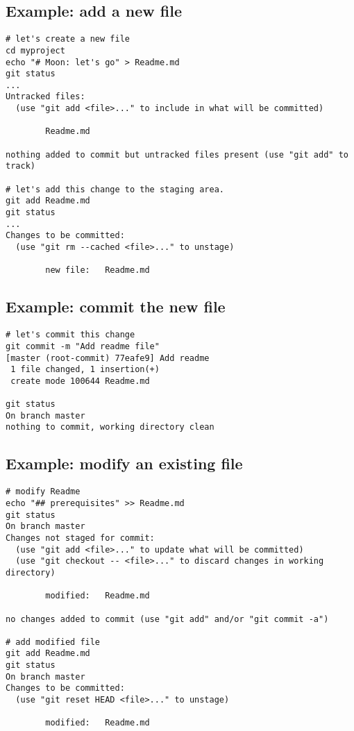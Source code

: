 \subsection{Example: add a new file}
\begin{frame}[fragile]
\subslidetitle
\begin{lstlisting}
# let's create a new file
cd myproject
echo "# Moon: let's go" > Readme.md
git status
...
Untracked files:
  (use "git add <file>..." to include in what will be committed)

        Readme.md

nothing added to commit but untracked files present (use "git add" to track)

# let's add this change to the staging area.
git add Readme.md
git status
...
Changes to be committed:
  (use "git rm --cached <file>..." to unstage)

        new file:   Readme.md
\end{lstlisting}
\end{frame}

\subsection{Example: commit the new file}
\begin{frame}[fragile]
\subslidetitle
\begin{lstlisting}
# let's commit this change
git commit -m "Add readme file"
[master (root-commit) 77eafe9] Add readme
 1 file changed, 1 insertion(+)
 create mode 100644 Readme.md

git status
On branch master
nothing to commit, working directory clean
\end{lstlisting}
\end{frame}

\subsection{Example: modify an existing file}
\begin{frame}[fragile]
\subslidetitle
\begin{lstlisting}
# modify Readme
echo "## prerequisites" >> Readme.md
git status
On branch master
Changes not staged for commit:
  (use "git add <file>..." to update what will be committed)
  (use "git checkout -- <file>..." to discard changes in working directory)

        modified:   Readme.md

no changes added to commit (use "git add" and/or "git commit -a")

# add modified file
git add Readme.md
git status
On branch master
Changes to be committed:
  (use "git reset HEAD <file>..." to unstage)

        modified:   Readme.md
\end{lstlisting}
\end{frame}

